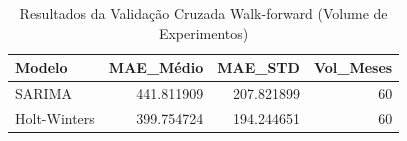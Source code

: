 \begin{table}
\caption{Resultados da Validação Cruzada Walk-forward (Volume de Experimentos)}
\label{tab:cv_series}
\begin{tabular}{lrrr}
\toprule
Modelo & MAE_Médio & MAE_STD & Vol_Meses \\
\midrule
SARIMA & 441.811909 & 207.821899 & 60 \\
Holt-Winters & 399.754724 & 194.244651 & 60 \\
\bottomrule
\end{tabular}
\end{table}

